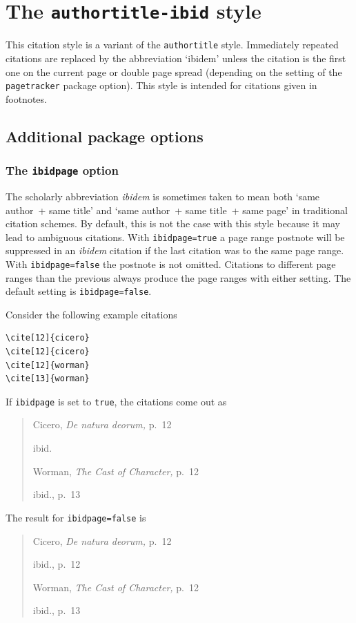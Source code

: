 \documentclass[a4paper]{article}
\begin{document}
\section*{The \texttt{authortitle-ibid} style}

This citation style is a variant of the \texttt{authortitle} style.
Immediately repeated citations are replaced by the abbreviation
`ibidem' unless the citation is the first one on the current page or
double page spread (depending on the setting of the
\texttt{pagetracker} package option). This style is intended for
citations given in footnotes.

\subsection*{Additional package options}

\subsubsection*{The \texttt{ibidpage} option}

The scholarly abbreviation \emph{ibidem} is sometimes taken to mean
both `same author~+ same title' and `same author~+ same title~+ same
page' in traditional citation schemes. By default, this is not the
case with this style because it may lead to ambiguous citations.
With \texttt{ibidpage=true} a page range postnote will be suppressed
in an \emph{ibidem} citation if the last citation was to the same
page range. With \texttt{ibidpage=false} the postnote is not omitted.
Citations to different page ranges than the previous always produce
the page ranges with either setting.
The default setting is \texttt{ibidpage=false}.

Consider the following example citations
\begin{verbatim}
\cite[12]{cicero}
\cite[12]{cicero}
\cite[12]{worman}
\cite[13]{worman}
\end{verbatim}
%
If \texttt{ibidpage} is set to \texttt{true}, the citations
come out as
\begin{quote}
Cicero, \emph{De natura deorum,} p.~12

ibid.

Worman, \emph{The Cast of Character,} p.~12

ibid., p.~13
\end{quote}
%
The result for \texttt{ibidpage=false} is
\begin{quote}
Cicero, \emph{De natura deorum,} p.~12

ibid., p.~12

Worman, \emph{The Cast of Character,} p.~12

ibid., p.~13
\end{quote}
\end{document}
